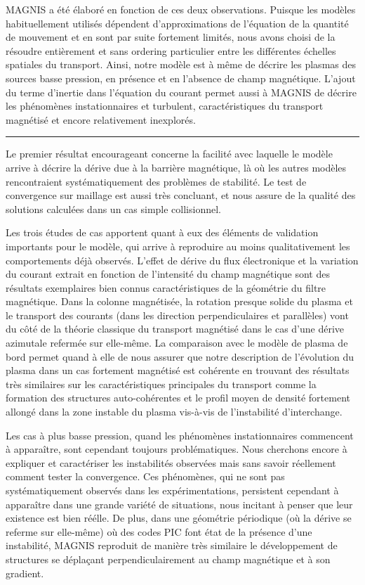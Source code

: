 MAGNIS a été élaboré en fonction de ces deux observations. Puisque les modèles
habituellement utilisés dépendent d'approximations de
l'équation de la quantité de mouvement et en sont par suite fortement limités,
nous avons choisi de la résoudre entièrement et sans ordering particulier entre les
différentes échelles spatiales du transport. Ainsi, notre modèle est à même de
décrire les plasmas des sources basse pression, en présence et en l'absence de champ magnétique.
L'ajout du terme d'inertie dans l'équation du courant permet aussi à MAGNIS de
décrire les phénomènes instationnaires et turbulent, caractéristiques du
transport magnétisé et encore relativement inexplorés. 

\begin{center}
\rule{0.6\textwidth}{1pt}
\end{center}

Le premier résultat encourageant concerne la facilité avec laquelle le modèle
arrive à décrire la dérive due à la barrière magnétique, là où les autres
modèles rencontraient systématiquement des problèmes de stabilité. Le test de
convergence sur maillage est aussi très concluant, et nous assure de la qualité
des solutions calculées dans un cas simple collisionnel. 

Les trois études de cas apportent quant à eux des éléments de validation
importants pour le modèle, qui arrive à reproduire au moins qualitativement les
comportements déjà observés. L'effet de dérive du flux électronique et la
variation du courant extrait en fonction de l'intensité du champ magnétique sont des
résultats exemplaires bien connus caractéristiques de la géométrie du filtre
magnétique.
Dans la colonne magnétisée, la rotation presque solide du plasma et le
transport des courants (dans les direction perpendiculaires et parallèles) vont
du côté de la théorie classique du transport magnétisé dans le cas d'une dérive
azimutale refermée sur elle-même.
La comparaison avec le modèle de plasma de bord permet quand à elle de nous
assurer que notre description de l'évolution du plasma dans un cas fortement
magnétisé est cohérente en trouvant des résultats très similaires sur les
caractéristiques principales du transport comme la formation des structures
auto-cohérentes et le profil moyen de densité fortement allongé dans la zone
instable du plasma vis-à-vis de l'instabilité d'interchange.

Les cas à plus basse pression, quand les phénomènes instationnaires
commencent à apparaître, sont cependant toujours problématiques. Nous
cherchons encore à expliquer et caractériser les instabilités observées mais
sans savoir réellement comment tester la convergence. Ces phénomènes, qui ne
sont pas systématiquement observés dans les expérimentations, 
persistent cependant à apparaître dans une grande variété de situations, nous
incitant à penser que leur existence est bien réélle. De plus, dans une
géométrie périodique (où la dérive se referme sur elle-même) où des codes PIC
font état de la présence d'une instabilité, MAGNIS reproduit de manière très similaire 
le développement de structures se déplaçant perpendiculairement au champ
magnétique et à son gradient.

